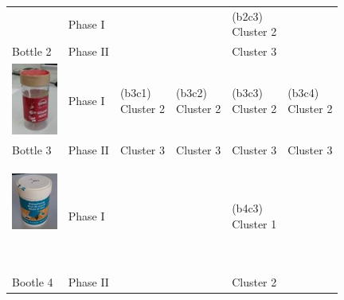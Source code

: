 \begin{table}
\begin{tabular}{p{1.4cm} p{1.4cm}|p{1.6cm} p{1.6cm} p{1.6cm}  p{1.6cm} }
         & Phase I  &           &           &{\vspace{-0.7cm}}\pbox{2cm}{(b2c3) \\Cluster 2} &           \\
Bottle 2 & Phase II &           &           &       Cluster 3 &           \\ \hline
{\parbox[c]{1em}{\includegraphics[width=1.5cm]{./fig/b3.jpg}} }
         & Phase I  &{\vspace{-0.7cm}}\pbox{2cm}{(b3c1) \\Cluster 2} &{\vspace{-0.7cm}}\pbox{2cm}{(b3c2) \\Cluster 2} &{\vspace{-0.7cm}}\pbox{2cm}{(b3c3) \\Cluster 2} &{\vspace{-0.7cm}}\pbox{2cm}{(b3c4) \\Cluster 2} \\
Bottle 3 & Phase II &       Cluster 3 &       Cluster 3 &       Cluster 3 &       Cluster 3 \\ \hline
{\parbox[c]{1em}{\includegraphics[width=1.5cm]{./fig/b4.jpg}}\newline }
         & Phase I  &           &           &{\vspace{-0.7cm}}\pbox{2cm}{(b4c3) \\Cluster 1} &           \\
Bootle 4 & Phase II &           &           &       Cluster 2 &           \\ \hline
\end{tabular}
\label{tab:cluster}
\end{table}

